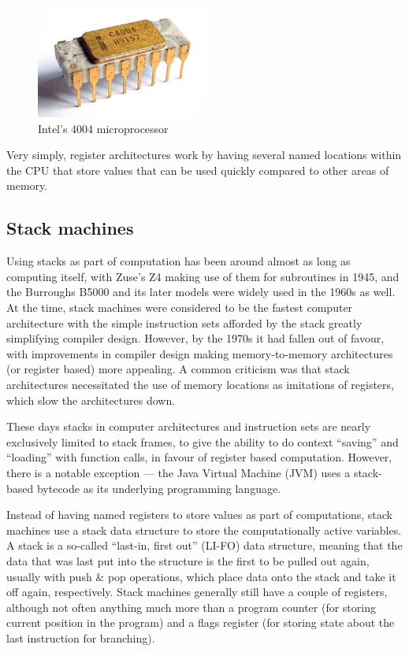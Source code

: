 \begin{figure}
  \includegraphics[width=0.5\textwidth]{imgs/Intel_C4004}
  \caption{Intel's 4004 microprocessor}
\label{fig:4004}
\end{figure}

Very simply, register architectures work by having several named locations
within the CPU that store values that can be used quickly compared to other
areas of memory.

\subsection{Stack machines}
Using stacks as part of computation has been around almost as long as computing
itself, with Zuse's Z4 making use of them for subroutines in
1945,\cite{Speiser2000KZZ} and the Burroughs B5000 and its later models were
widely used in the 1960s as well.\cite{Organick2014Computer} At the time, stack
machines were considered to be the fastest computer architecture with the simple
instruction sets afforded by the stack greatly simplifying compiler design.
However, by the 1970s it had fallen out of favour, with improvements in compiler
design making memory-to-memory architectures (or register based) more
appealing. A common criticism was that stack architectures necessitated the use
of memory locations as imitations of registers, which slow the architectures
down.\cite{Myers1977CAS}

These days stacks in computer architectures and instruction sets are nearly
exclusively limited to stack frames, to give the ability to do context
``saving'' and ``loading'' with function calls, in favour of register based
computation. However, there is a notable exception --- the Java Virtual Machine
(JVM) uses a stack-based bytecode as its underlying programming
language.\cite{Schoeberl2005Design}

Instead of having named registers to store values as part of computations, stack
machines use a stack data structure to store the computationally active
variables. A stack is a so-called ``last-in, first out'' (LI-FO) data structure,
meaning that the data that was last put into the structure is the first to be
pulled out again, usually with push \& pop operations, which place data onto the
stack and take it off again, respectively. Stack machines generally still have a
couple of registers, although not often anything much more than a program
counter (for storing current position in the program) and a flags register (for
storing state about the last instruction for branching).

